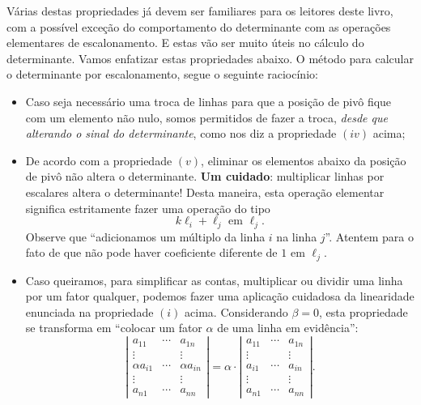 \documentclass[../livro.tex]{subfiles}  %
\begin{document}
Várias destas propriedades já devem ser familiares para os leitores deste livro, com a possível exceção do comportamento do determinante com as operações elementares de escalonamento. E estas vão ser muito úteis no cálculo do determinante. Vamos enfatizar estas propriedades abaixo. O método para calcular o determinante por escalonamento, segue o seguinte raciocínio:
\begin{itemize}
\item Caso seja necessário uma troca de linhas para que a posição de pivô fique com um elemento não nulo, somos permitidos de fazer a troca, \textit{desde que alterando o sinal do determinante}, como nos diz a propriedade $(iv)$ acima;
\item De acordo com a propriedade $(v)$, eliminar os elementos abaixo da posição de pivô não altera o determinante. \textbf{Um cuidado}: multiplicar linhas por escalares altera o determinante! Desta maneira, esta operação elementar significa estritamente fazer uma operação do tipo
\[
k \ell_i + \ell_j \text{ em } \ell_j.
\] Observe que ``adicionamos um múltiplo da linha $i$ na linha $j$''. Atentem para o fato de que não pode haver coeficiente diferente de $1$ em $\ell_j$.
\item Caso queiramos, para simplificar as contas, multiplicar ou dividir uma linha por um fator qualquer, podemos fazer uma aplicação cuidadosa da linearidade enunciada na propriedade $(i)$ acima. Considerando $\beta = 0$, esta propriedade se transforma em ``colocar um fator $\alpha$ de uma linha em evidência'':
\[
\left| \begin{matrix}
a_{11} & \cdots & a_{1n} \\
\vdots &  & \vdots \\
\alpha a_{i1} & \cdots & \alpha a_{in} \\
\vdots &  & \vdots \\
a_{n1} & \cdots & a_{nn}
\end{matrix} \right|  = 
\alpha \cdot \left| \begin{matrix}
a_{11} & \cdots & a_{1n} \\
\vdots &  & \vdots \\
a_{i1} & \cdots & a_{in} \\
\vdots &  & \vdots \\
a_{n1} & \cdots & a_{nn}
\end{matrix}\right| .
\]
\end{itemize}
\end{document}
